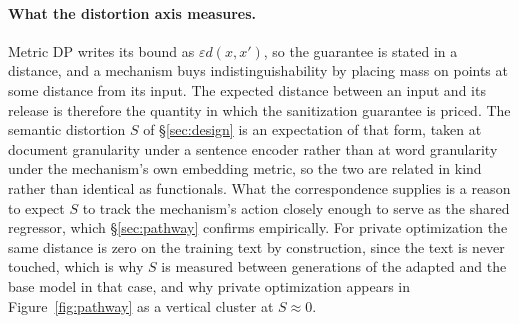 \paragraph{What the distortion axis measures.}
Metric DP writes its bound as $\varepsilon d(x, x')$,
so the guarantee is stated in a distance,
and a mechanism buys indistinguishability by placing mass on points at some distance from its input.
The expected distance between an input and its release is therefore the quantity in which the sanitization guarantee is priced.
The semantic distortion $S$ of \S\ref{sec:design} is an expectation of that form,
taken at document granularity under a sentence encoder rather than at word granularity under the mechanism's own embedding metric,
so the two are related in kind rather than identical as functionals.
What the correspondence supplies is a reason to expect $S$ to track the mechanism's action closely enough to serve as the shared regressor,
which \S\ref{sec:pathway} confirms empirically.
For private optimization the same distance is zero on the training text by construction,
since the text is never touched,
which is why $S$ is measured between generations of the adapted and the base model in that case,
and why private optimization appears in Figure~\ref{fig:pathway} as a vertical cluster at $S \approx 0$.
